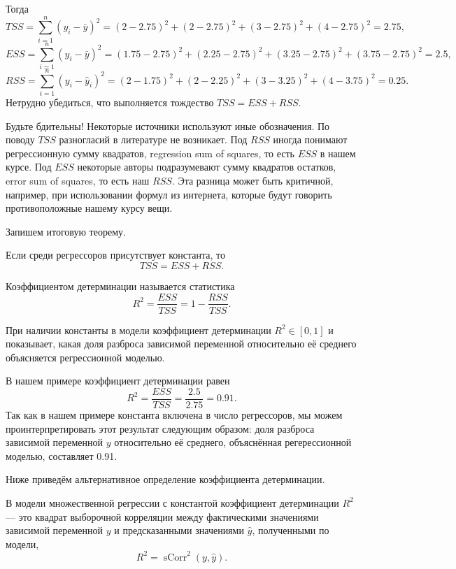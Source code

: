 \documentclass[12pt]{article}
\DeclareMathOperator{\sCorr}{sCorr}
\newcommand{\hy}{\hat{y}}
\newcommand{\RSS}{RSS}
\newcommand{\ESS}{ESS}
\newcommand{\TSS}{TSS}
\begin{document}
Тогда
\[
\TSS = \sum_{i=1}^n (y_i - \bar{y})^2 = (2-2.75)^2 + (2-2.75)^2 + (3-2.75)^2 + (4-2.75)^2 = 2.75,
\]
\[
\ESS = \sum_{i=1}^n (y_i - \bar{y})^2 = (1.75-2.75)^2 + (2.25-2.75)^2 + (3.25-2.75)^2 + (3.75-2.75)^2 = 2.5,
\]
\[
\RSS = \sum_{i=1}^n (y_i - \hy_i)^2 = (2-1.75)^2 + (2-2.25)^2 + (3-3.25)^2 + (4-3.75)^2 = 0.25.
\]
Нетрудно убедиться, что выполняется тождество $\TSS = \ESS + \RSS$.

Будьте бдительны! 
Некоторые источники используют иные обозначения. 
По поводу $\TSS$ разногласий в литературе не возникает. 
Под $\RSS$ иногда понимают регрессионную сумму квадратов, regression sum of squares, то есть $\ESS$ в нашем курсе. 
Под $\ESS$ некоторые авторы подразумевают сумму квадратов остатков, error sum of squares, то есть наш $\RSS$. 
Эта разница может быть критичной, например, при использовании формул из интернета, которые будут говорить противоположные нашему курсу вещи.

Запишем итоговую теорему.
\begin{theorem}
Если среди регрессоров присутствует константа, то
\[
\label{tss}
    \TSS = \ESS + \RSS.
\]
\end{theorem}



\begin{definition}
Коэффициентом детерминации называется статистика 
\[
R^2 = \frac{\ESS}{\TSS} = 1 - \frac{\RSS}{\TSS}.
\]    
\end{definition}

При наличии константы в модели коэффициент детерминации $R^2 \in [0,1]$ и показывает, какая доля разброса зависимой переменной относительно её среднего объясняется регрессионной моделью.

В нашем примере коэффициент детерминации равен
\[
R^2 = \frac{\ESS}{\TSS} = \frac{2.5}{2.75} = 0.91.
\]
Так как в нашем примере константа включена в число регрессоров, мы можем проинтерпретировать этот результат следующим образом: доля разброса зависимой переменной $y$ относительно её среднего, объяснённая регерессионной моделью, составляет 0.91.

Ниже приведём альтернативное определение коэффициента детерминации.

\begin{definition} В модели множественной регрессии с константой коэффициент детерминации $R^2$ — это квадрат выборочной корреляции между фактическими значениями зависимой переменной $y$ и предсказанными значениями $\hat{y}$, полученными по модели, 
\[
R^2 = \sCorr^2(y, \hy).
\]
\end{definition}
\end{document}
